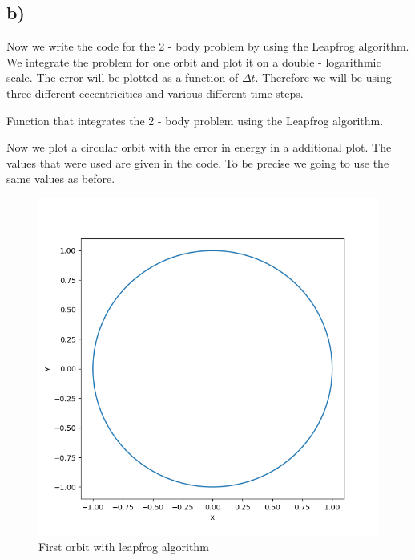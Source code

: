 \documentclass[11pt, a4paper, reqno]{scrartcl}
\begin{document}
    	\newpage
    		
    	\subsection*{b)}
			Now we write the code for the 2 - body problem by using the 
			Leapfrog algorithm. We integrate the problem for one orbit and 
			plot it on a double - logarithmic scale. The error will be plotted 
			as a function of $\Delta t$. Therefore we will be using three 
			different eccentricities and various different time steps.
			\newline
			
			Function that integrates the 2 - body problem using the Leapfrog 
			algorithm.
			
    		\begin{figure}[H]
        		        
    		\end{figure}
    		
    		
    		Now we plot a circular orbit with the error in energy in a 
    		additional plot. The values that were used are given in the code. To 
    		be precise we going to use the same values as before.
    		
    		\begin{figure}[H]
        		   
    		\end{figure}
    		
    		\begin{figure}[H]
    			\includegraphics[width=.5\paperwidth]{figure_leap_1.png}
    			\caption{First orbit with leapfrog algorithm}
    		\end{figure}
    		
\end{document}
